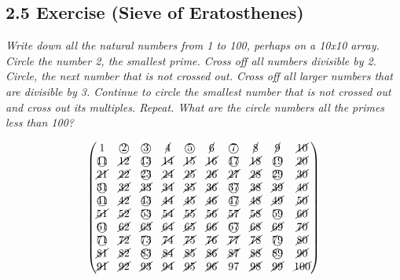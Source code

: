 \documentclass{article}
\begin{document}
\subsection*{2.5 Exercise (Sieve of Eratosthenes)} 
\quad \textit{Write down all the natural numbers from 1 to 100, perhaps on a 10x10 array. Circle the number 2, the smallest prime. Cross off all numbers divisible by 2. Circle, the next number that is not crossed out. Cross off all larger numbers that are divisible by 3. Continue to circle the smallest number that is not crossed out and cross out its multiples. Repeat. What are the circle numbers all the primes less than 100?}

\begin{equation*}
    \begin{pmatrix}
        1 & \text{\textcircled{2}} & \text{\textcircled{3}} & \cancel{4} & \text{\textcircled{5}} & \cancel{6} & \text{\textcircled{7}} & \cancel{8} & \cancel{9} & \cancel{10}\\
        \text{\textcircled{11}} & \cancel{12} & \text{\textcircled{13}} & \cancel{14} & \cancel{15} & \cancel{16} & \text{\textcircled{17}} & \cancel{18} & \text{\textcircled{19}} & \cancel{20}\\
        \cancel{21} & \cancel{22} & \text{\textcircled{23}} & \cancel{24} & \cancel{25} & \cancel{26} & \cancel{27} & \cancel{28} & \text{\textcircled{29}} & \cancel{30}\\
        \text{\textcircled{31}} & \cancel{32} & \cancel{33} & \cancel{34} & \cancel{35} & \cancel{36} & \text{\textcircled{37}} & \cancel{38} & \cancel{39} & \cancel{40}\\
        \text{\textcircled{41}} & \cancel{42} & \text{\textcircled{43}} & \cancel{44} & \cancel{45} & \cancel{46} & \text{\textcircled{47}} & \cancel{48} & \cancel{49} & \cancel{50}\\
        \cancel{51} & \cancel{52} & \text{\textcircled{53}} & \cancel{54} & \cancel{55} & \cancel{56} & \cancel{57} & \cancel{58} & \text{\textcircled{59}} & \cancel{60}\\
        \text{\textcircled{61}} & \cancel{62} & \cancel{63} & \cancel{64} & \cancel{65} & \cancel{66} & \text{\textcircled{67}} & \cancel{68} & \cancel{69} & \cancel{70}\\
        \text{\textcircled{71}} & \cancel{72} & \text{\textcircled{73}} & \cancel{74} & \cancel{75} & \cancel{76} & \cancel{77} & \cancel{78} & \text{\textcircled{79}} & \cancel{80}\\
        \cancel{81} & \cancel{82} & \text{\textcircled{83}} & \cancel{84} & \cancel{85} & \cancel{86} & \cancel{87} & \cancel{88} & \text{\textcircled{89}} & \cancel{90}\\
        \cancel{91} & \cancel{92} & \cancel{93} & \cancel{94} & \cancel{95} & \cancel{96} & 97 & \cancel{98} & \cancel{99} & \cancel{100}
    \end{pmatrix}
\end{equation*}
\end{document}
